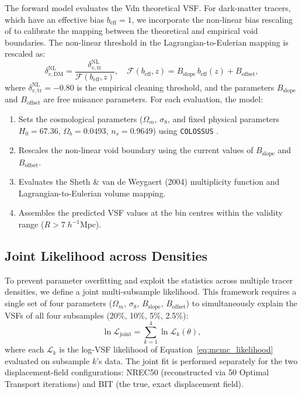 \documentclass[12pt]{report}
\begin{document}
The forward model evaluates the Vdn theoretical VSF. For dark-matter tracers, which have an effective bias $b_{\mathrm{eff}} = 1$, we incorporate the non-linear bias rescaling of \citet{Contarini2019} to calibrate the mapping between the theoretical and empirical void boundaries. The non-linear threshold in the Lagrangian-to-Eulerian mapping is rescaled as:
\begin{equation}
    \delta^{\mathrm{NL}}_{v,\mathrm{DM}} = \frac{\delta^{\mathrm{NL}}_{v,\mathrm{tr}}}{\mathcal{F}(b_{\mathrm{eff}}, z)}, \quad \mathcal{F}(b_{\mathrm{eff}}, z) = B_{\mathrm{slope}}\,b_{\mathrm{eff}}(z) + B_{\mathrm{offset}},
\end{equation}
where $\delta^{\mathrm{NL}}_{v,\mathrm{tr}} = -0.80$ is the empirical cleaning threshold, and the parameters $B_{\mathrm{slope}}$ and $B_{\mathrm{offset}}$ are free nuisance parameters. For each evaluation, the model:
\begin{enumerate}
    \item Sets the cosmological parameters ($\Omega_m$, $\sigma_8$, and fixed physical parameters $H_0 = 67.36$, $\Omega_b = 0.0493$, $n_s = 0.9649$) using \texttt{COLOSSUS} \citep{Diemer2018}.
    \item Rescales the non-linear void boundary using the current values of $B_{\mathrm{slope}}$ and $B_{\mathrm{offset}}$.
    \item Evaluates the Sheth \& van de Weygaert (2004) multiplicity function and Lagrangian-to-Eulerian volume mapping.
    \item Assembles the predicted VSF values at the bin centres within the validity range ($R > 7\;h^{-1}\mathrm{Mpc}$).
\end{enumerate}

\subsection{Joint Likelihood across Densities}

To prevent parameter overfitting and exploit the statistics across multiple tracer densities, we define a joint multi-subsample likelihood. This framework requires a single set of four parameters ($\Omega_m$, $\sigma_8$, $B_{\mathrm{slope}}$, $B_{\mathrm{offset}}$) to simultaneously explain the VSFs of all four subsamples (20\%, 10\%, 5\%, 2.5\%):
\begin{equation}
    \ln \mathcal{L}_{\mathrm{joint}} = \sum_{k=1}^{4} \ln \mathcal{L}_k(\theta),
\end{equation}
where each $\mathcal{L}_k$ is the log-VSF likelihood of Equation~\ref{eq:mcmc_likelihood} evaluated on subsample $k$'s data. The joint fit is performed separately for the two displacement-field configurations: NREC50 (reconstructed via 50 Optimal Transport iterations) and BIT (the true, exact displacement field).
\end{document}
